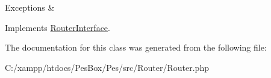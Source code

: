 \begin{DoxyExceptions}{Exceptions}
{\em } & \\
\hline
\end{DoxyExceptions}


Implements \mbox{\hyperlink{interface_pes_1_1_router_1_1_router_interface}{Router\+Interface}}.



The documentation for this class was generated from the following file\+:\begin{DoxyCompactItemize}
\item 
C\+:/xampp/htdocs/\+Pes\+Box/\+Pes/src/\+Router/Router.\+php\end{DoxyCompactItemize}
